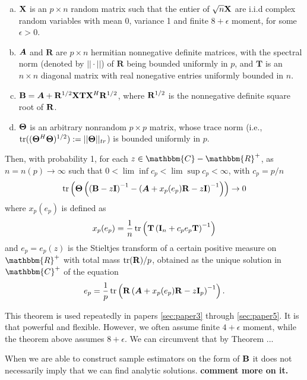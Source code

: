 \documentclass[]{book}\usepackage{knitr}
\begin{document}
\begin{theorem}
\begin{enumerate}[(a)]
  \item $\mathbf{X}$ is an $p \times n$ random matrix such that the entier of $\sqrt{n}\mathbf{X}$ are i.i.d complex random variables with mean 0, variance 1 and finite $8+\epsilon$ moment, for some $\epsilon > 0$.
  \item $\mbox{\boldmath$A$}$ and $\mathbf{R}$ are $p \times n$ hermitian nonnegative definite matrices, with the spectral norm (denoted by $||\cdot||$) of $\mathbf{R}$ being bounded uniformly in $p$, and $\mathbf{T}$ is an $n \times n$ diagonal matrix with real nonegative entries  uniformly bounded in $n$.
  \item $\mathbf{B}=\mbox{\boldmath$A$} + \mathbf{R}^{1/2} \mathbf{X} \mathbf{T} \mathbf{X}^H \mathbf{R}^{1/2}$, where $\mathbf{R}^{1/2}$ is the nonnegative definite square root of $\mathbf{R}$.
  \item $\mathbf{\Theta}$ is an arbitrary nonrandom $p \times p$ matrix, whose trace norm (i.e., $\operatorname{tr}((\mathbf{\Theta}^H \mathbf{\Theta})^{1/2}):=||\mathbf{\Theta}||_{tr}$) is bounded uniformly in $p$.
\end{enumerate}
Then, with probability 1, for each $z\in \mathbbm{C}-\mathbbm{R}^+$, as $n=n(p) \rightarrow \infty$ such that $0<\lim\inf c_p<\lim \sup c_p < \infty$, with $c_p = p/n$
\begin{equation}
  \operatorname{tr}\left(\mathbf{\Theta}\left( \left(\mathbf{B} - z\mathbf{I}\right)^{-1} - \left( \mbox{\boldmath$A$} + x_p(e_p)\mathbf{R} - z\mathbf{I} \right)^{-1} \right) \right) \rightarrow 0
\end{equation}
where $x_p(e_p)$ is defined as
\begin{equation}
  x_p(e_p) = \frac{1}{n}\operatorname{tr} \left( \mathbf{T} \left(\mathbf{I}_n + c_p e_p \mathbf{T} \right)^{-1} \right)
\end{equation}
and $e_p=e_p(z)$ is the Stieltjes transform of a certain positive measure on $\mathbbm{R}^+$ with total mass $\operatorname{tr}(\mathbf{R})/p$, obtained as the unique solution in $\mathbbm{C}^+$ of the equation
\begin{equation}
  e_p = \frac{1}{p}\operatorname{tr} \left( \mathbf{R} \left(\mbox{\boldmath$A$} +  x_p(e_p) \mathbf{R} - z\mathbf{I}_p \right)^{-1} \right).
\end{equation}
\end{theorem}
This theorem is used repeatedly in papers \ref{sec:paper3} through \ref{sec:paper5}. It is that powerful and flexible. However, we often assume finite $4+\epsilon$ moment, while the theorem above assumes $8+\epsilon$. We can circumvent that by Theorem \citet{REF}... 

When we are able to construct sample estimators on the form of $\mathbf{B}$ it does not necessarily imply that we can find analytic solutions. \textbf{comment more on it.}
\end{document}
